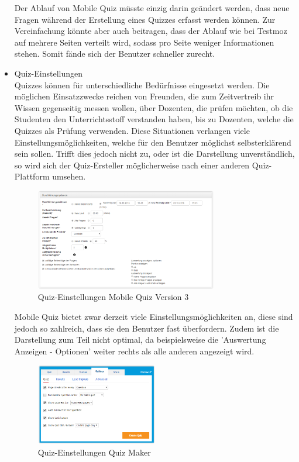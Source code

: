 \begin{itemize}
		Der Ablauf von Mobile Quiz müsste einzig darin geändert werden, dass neue Fragen während der Erstellung eines Quizzes erfasst werden können. Zur Vereinfachung könnte aber auch beitragen, dass der Ablauf wie bei Testmoz \cite{testmoz.com} auf mehrere Seiten verteilt wird, sodass pro Seite weniger Informationen stehen. Somit fände sich der Benutzer schneller zurecht.
		
		
		\newpage
		\item  Quiz-Einstellungen \\
		Quizzes können für unterschiedliche Bedürfnisse eingesetzt werden. Die möglichen Einsatzzwecke reichen von Freunden, die zum Zeitvertreib ihr Wissen gegenseitig messen wollen, über Dozenten, die prüfen möchten, ob die Studenten den Unterrichtsstoff verstanden haben, bis zu Dozenten, welche die Quizzes als Prüfung verwenden.
		Diese Situationen verlangen viele Einstellungsmöglichkeiten, welche für den Benutzer möglichst selbsterklärend sein sollen. Trifft dies jedoch nicht zu, oder ist die Darstellung unverständlich, so wird sich der Quiz-Ersteller möglicherweise nach einer anderen Quiz-Plattform umsehen.
		
		\begin{figure}[H]
			\centering
			\includegraphics[width=0.75\textwidth
			]{Images/MobileQuiz_Quiz-Settings.PNG}
			\caption{Quiz-Einstellungen Mobile Quiz Version 3}
		\end{figure}
		
		
		Mobile Quiz bietet zwar derzeit viele Einstellungsmöglichkeiten an, diese sind jedoch so zahlreich, dass sie den Benutzer fast überfordern. Zudem ist die Darstellung zum Teil nicht optimal, da beispielsweise die 'Auswertung Anzeigen - Optionen' weiter rechts als alle anderen angezeigt wird.
		
		\begin{figure}[H]
			\centering
			\includegraphics[width=0.5\textwidth
			]{Images/QuizMaker_Quiz-Settings.PNG}
			\caption{Quiz-Einstellungen Quiz Maker}
		\end{figure}
		

\end{itemize}
